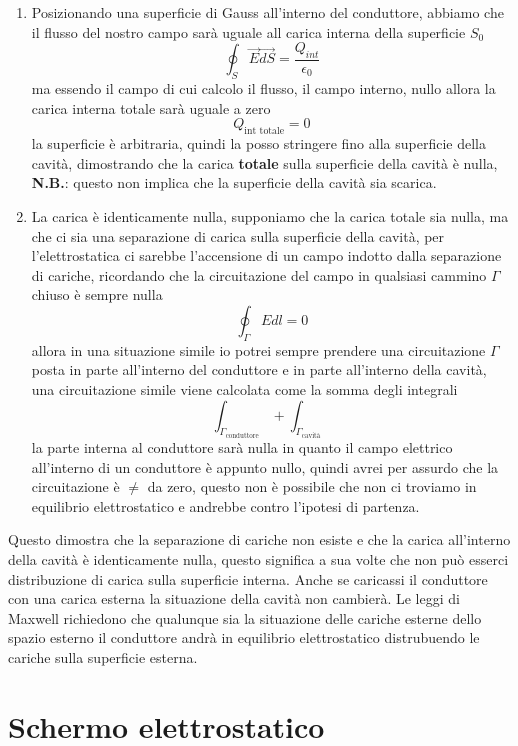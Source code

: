 \documentclass[a4paper, 12pt]{book}
\theoremstyle{plain}
\begin{document}
\begin{enumerate}
    \item Posizionando una superficie di Gauss all'interno del conduttore, abbiamo che il flusso del nostro campo sarà uguale all carica interna della superficie $S_0$ \[ \oint_S \vec{E}\vec{dS} = \frac{Q_{int}}{\epsilon_0}\] ma essendo il campo 
    di cui calcolo il flusso, il campo interno,  nullo allora la carica interna totale sarà uguale a zero \[Q_{\textrm{int totale}} = 0\] la superficie è arbitraria, quindi la posso stringere fino alla superficie della cavità, dimostrando che 
    la carica \textbf{totale} sulla superficie della cavità è nulla, \textbf{N.B.}: questo non implica che la superficie della cavità sia scarica.
    \item La carica è identicamente nulla, supponiamo che la carica totale sia nulla, ma che ci sia una separazione di carica sulla superficie della cavità, per l'elettrostatica ci sarebbe l'accensione di un campo 
    indotto dalla separazione di cariche, ricordando che la circuitazione del campo in qualsiasi cammino $\Gamma$ chiuso è sempre nulla \[ \oint_\Gamma Edl = 0 \] allora in una situazione simile io potrei sempre prendere una circuitazione $\Gamma$ posta 
    in parte all'interno del conduttore e in parte all'interno della cavità, una circuitazione simile viene calcolata come la somma degli integrali \[ \int_{\Gamma_{\textrm{conduttore}}} + \int_{\Gamma_{\textrm{cavità}}} \] la parte interna al conduttore sarà nulla 
    in quanto il campo elettrico all'interno di un conduttore è appunto nullo, quindi avrei per assurdo che la circuitazione è $\neq$ da zero, questo non è possibile che non ci troviamo in equilibrio elettrostatico e andrebbe contro l'ipotesi di partenza.
\end{enumerate}

Questo dimostra che la separazione di cariche non esiste e che la carica all'interno della cavità è identicamente nulla, questo significa a sua volte 
che non può esserci distribuzione di carica sulla superficie interna. Anche se caricassi il conduttore con una carica esterna la situazione della cavità non cambierà.
Le leggi di Maxwell richiedono che qualunque sia la situazione 
delle cariche esterne dello spazio esterno il conduttore 
andrà in equilibrio elettrostatico distrubuendo le cariche 
sulla superficie esterna.

\section{Schermo elettrostatico}
\end{document}
